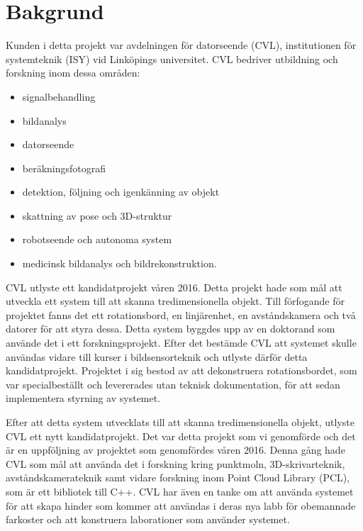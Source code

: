 \chapter{Bakgrund}
\label{cha:background}


Kunden i detta projekt var avdelningen för datorseende (CVL), institutionen för systemteknik (ISY) vid Linköpings universitet. CVL bedriver utbildning och forskning inom dessa områden:
\begin{itemize}
	\item signalbehandling
	\item bildanalys
	\item datorseende
	\item beräkningsfotografi
	\item detektion, följning och igenkänning av objekt
	\item skattning av pose och 3D-struktur
	\item robotseende och autonoma system
	\item medicinsk bildanalys och bildrekonstruktion.
\end{itemize}

CVL utlyste ett kandidatprojekt våren 2016. Detta projekt hade som mål att utveckla ett system till att skanna tredimensionella objekt. Till förfogande för projektet fanns det ett rotationsbord, en linjärenhet, en avståndskamera och två datorer för att styra dessa. Detta system byggdes upp av en doktorand som använde det i ett forskningsprojekt. Efter det bestämde CVL att systemet skulle användas vidare till kurser i bildsensorteknik och utlyste därför detta kandidatprojekt. Projektet i sig bestod av att dekonstruera rotationsbordet, som var specialbeställt och levererades utan teknisk dokumentation, för att sedan implementera styrning av systemet. 

Efter att detta system utvecklats till att skanna tredimensionella objekt, utlyste CVL ett nytt kandidatprojekt. Det var detta projekt som vi genomförde och det är en uppföljning av projektet som genomfördes våren 2016. Denna gång hade CVL som mål att använda det i forskning kring punktmoln, 3D-skrivarteknik, avståndskamerateknik samt vidare forskning inom Point Cloud Library (PCL), som är ett bibliotek till C++. CVL har även en tanke om att använda systemet för att skapa hinder som kommer att användas i deras nya labb för obemannade farkoster och att konstruera laborationer som använder systemet. 

